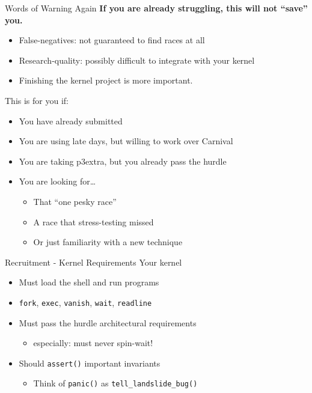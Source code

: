 \documentclass[xcolor=dvipsnames]{beamer}
\begin{document}
\begin{frame}{Words of Warning Again}
	\textbf{If you are already struggling, this will not ``save'' you.}
	\begin{itemize}
		\item False-negatives: not guaranteed to find races at all
		\item Research-quality: possibly difficult to integrate with your kernel
		\item Finishing the kernel project is more important.
	\end{itemize}
	\pause
	\linegap
	This is for you if:
	\begin{itemize}
		\item You have already submitted
		\item You are using late days, but willing to work over Carnival
		\item You are taking p3extra, but you already pass the hurdle
		\item You are looking for\ldots
			\begin{itemize}
				\item That ``one pesky race''
				\item A race that stress-testing missed
				\item Or just familiarity with a new technique
			\end{itemize}
	\end{itemize}
\end{frame}

\begin{frame}{Recruitment - Kernel Requirements}
	Your kernel
	\begin{itemize}
		\item Must load the shell and run programs
		\item \texttt{fork},
			\texttt{exec},
			\texttt{vanish},
			\texttt{wait},
			\texttt{readline}
		\item Must pass the hurdle architectural requirements
		\begin{itemize}
			\item especially: must never spin-wait!
		\end{itemize}
		\item Should \texttt{assert()} important invariants
		\begin{itemize}
			\item Think of \texttt{panic()} as \texttt{tell\_landslide\_bug()}
		\end{itemize}
	\end{itemize}
\end{frame}
\end{document}
